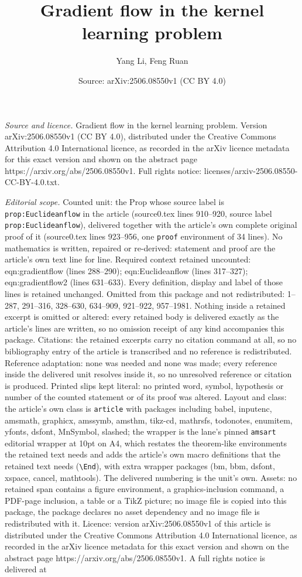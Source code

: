 \documentclass[10pt,a4paper]{amsart}
\title[Gradient flow in the kernel learning problem]{Gradient flow in the kernel learning problem}
\author{Yang Li, Feng Ruan}
\date{Source: arXiv:2506.08550v1 (CC BY 4.0)}
\begin{document}
\maketitle

\noindent\emph{Source and licence.} Gradient flow in the kernel learning problem. Version arXiv:2506.08550v1 (CC BY 4.0), distributed under the Creative Commons Attribution 4.0 International licence, as recorded in the arXiv licence metadata for this exact version and shown on the abstract page https://arxiv.org/abs/2506.08550v1. Full rights notice: licenses/arxiv-2506.08550-CC-BY-4.0.txt.\par\smallskip

\noindent\textit{Editorial scope.} Counted unit: the Prop whose source label is \texttt{prop:Euclideanflow} in the article (source0.tex lines 910--920, source label \texttt{prop:Euclideanflow}), delivered together with the article's own complete original proof of it (source0.tex lines 923--956, one \texttt{proof} environment of 34 lines). No mathematics is written, repaired or re-derived: statement and proof are the article's own text line for line. Required context retained uncounted: eqn:gradientflow (lines 288--290); eqn:Euclideanflow (lines 317--327); eqn:gradientflow2 (lines 631--633). Every definition, display and label of those lines is retained unchanged. Omitted from this package and not redistributed: 1--287, 291--316, 328--630, 634--909, 921--922, 957--1981. Nothing inside a retained excerpt is omitted or altered: every retained body is delivered exactly as the article's lines are written, so no omission receipt of any kind accompanies this package. Citations: the retained excerpts carry no citation command at all, so no bibliography entry of the article is transcribed and no reference is redistributed. Reference adaptation: none was needed and none was made; every reference inside the delivered unit resolves inside it, so no unresolved reference or citation is produced. Printed slips kept literal: no printed word, symbol, hypothesis or number of the counted statement or of its proof was altered. Layout and class: the article's own class is \texttt{article} with packages including babel, inputenc, amsmath, graphicx, amssymb, amsthm, tikz-cd, mathrsfs, todonotes, enumitem, yfonts, dsfont, MnSymbol, slashed; the wrapper is the lane's pinned \texttt{amsart} editorial wrapper at 10pt on A4, which restates the theorem-like environments the retained text needs and adds the article's own macro definitions that the retained text needs (\texttt{\textbackslash End}), with extra wrapper packages (bm, bbm, dsfont, xspace, cancel, mathtools). The delivered numbering is the unit's own. Assets: no retained span contains a figure environment, a graphics-inclusion command, a PDF-page inclusion, a table or a TikZ picture; no image file is copied into this package, the package declares no asset dependency and no image file is redistributed with it. Licence: version arXiv:2506.08550v1 of this article is distributed under the Creative Commons Attribution 4.0 International licence, as recorded in the arXiv licence metadata for this exact version and shown on the abstract page https://arxiv.org/abs/2506.08550v1. A full rights notice is delivered at 
\end{document}
